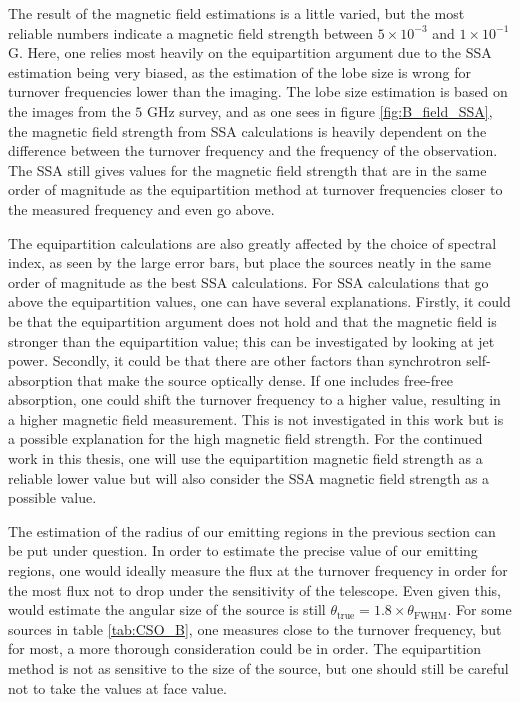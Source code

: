 

The result of the magnetic field estimations is a little varied, but the most reliable numbers indicate a magnetic field strength between $5 \times 10^{-3}$ and $1 \times 10^{-1}$ G. Here, one relies most heavily on the equipartition argument due to the SSA estimation being very biased, as the estimation of the lobe size is wrong for turnover frequencies lower than the imaging. The lobe size estimation is based on the images from the $5$ GHz survey, and as one sees in figure \ref{fig:B_field_SSA}, the magnetic field strength from SSA calculations is heavily dependent on the difference between the turnover frequency and the frequency of the observation. The SSA still gives values for the magnetic field strength that are in the same order of magnitude as the equipartition method at turnover frequencies closer to the measured frequency and even go above.

The equipartition calculations are also greatly affected by the choice of spectral index, as seen by the large error bars, but place the sources neatly in the same order of magnitude as the best SSA calculations. For SSA calculations that go above the equipartition values, one can have several explanations. Firstly, it could be that the equipartition argument does not hold and that the magnetic field is stronger than the equipartition value; this can be investigated by looking at jet power. Secondly, it could be that there are other factors than synchrotron self-absorption that make the source optically dense. If one includes free-free absorption, one could shift the turnover frequency to a higher value, resulting in a higher magnetic field measurement. This is not investigated in this work but is a possible explanation for the high magnetic field strength. For the continued work in this thesis, one will use the equipartition magnetic field strength as a reliable lower value but will also consider the SSA magnetic field strength as a possible value. %

The estimation of the radius of our emitting regions in the previous section can be put under question. In order to estimate the precise value of our emitting regions, one would ideally measure the flux at the turnover frequency in order for the most flux not to drop under the sensitivity of the telescope. Even given this, \cite{1983ApJ...264..296M} would estimate the angular size of the source is still $\theta_{\text{true}} = 1.8\times \theta_{\text{FWHM}}$. For some sources in table \ref{tab:CSO_B}, one measures close to the turnover frequency, but for most, a more thorough consideration could be in order. The equipartition method is not as sensitive to the size of the source, but one should still be careful not to take the values at face value. 

